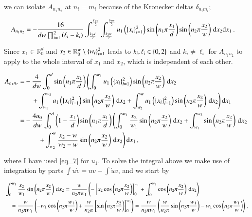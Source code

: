 \documentclass[11pt,english,a4paper]{article}
\begin{document}
\begin{flushleft}
we can isolate $A_{n_1 n_2}$ at $n_i=m_i$ because of the Kronecker deltas $\delta_{n_i m_i}$;

\begin{align*}
A_{n_1 n_2} &=  - \frac{16}{dw\prod_{i=1}^2\left({\ell_i-k_i}\right)}\int_{\frac{k_1 d}{2}}^{\frac{\ell_1 d}{2}}\int_{\frac{k_2 w}{2}}^{\frac{\ell_2 w}{2}} u_1\left({\left\lbrace{x_i}\right\rbrace_{i=1}^2}\right)\sin\left({n_1\pi\frac{x_1}{d}}\right)\sin\left({n_2\pi\frac{x_2}{w}}\right)\,\mathrm{d}x_2\mathrm{d}x_1 \,.
\end{align*}

Since $x_1\in\mathbb{R}_0^d$ and $x_2\in\mathbb{R}_0^w\setminus \left\lbrace{w_i}\right\rbrace_{i=1}^2$ leads to $k_i,\ell_i \in \left\lbrace{0,2}\right\rbrace$ and $k_i\neq \ell_i$ for $A_{n_1 n_2}$ to apply to the whole interval of $x_1$ and $x_2$, which is independent of each other.

\begin{align*}
A_{n_1 n_2} =&  -\frac{4}{dw}\int_{0}^{d}\sin\left({n_1\pi\frac{x_1}{d}}\right)\left(\int_{0}^{w_1} u_1\left({\left\lbrace{x_i}\right\rbrace_{i=1}^2}\right)\sin\left({n_2\pi\frac{x_2}{w}}\right)\,\mathrm{d}x_2 \right.
\\
&\quad \left.+ \int_{w_1}^{w_2} u_1\left({\left\lbrace{x_i}\right\rbrace_{i=1}^2}\right)\sin\left({n_2\pi\frac{x_2}{w}}\right)\,\mathrm{d}x_2
+ \int_{w_2}^{w} u_1\left({\left\lbrace{x_i}\right\rbrace_{i=1}^2}\right)\sin\left({n_2\pi\frac{x_2}{w}}\right)\,\mathrm{d}x_2\right)\mathrm{d}x_1 
\\
=& -\frac{4 u_0}{dw}\int_{0}^{d}\left({1-\frac{x_1}{d}}\right)\sin\left({n_1\pi\frac{x_1}{d}}\right)\left(\int_0^{w_1}\frac{x_2}{w_1} \sin\left({n_2\pi\frac{x_2}{w}}\right)\,\mathrm{d}x_2 + \int_{w_1}^{w_2}\sin\left({n_2\pi\frac{x_2}{w}}\right)\,\mathrm{d}x_2 \right.
\\
&\qquad \left. + \int_{w_2}^{w}\frac{x_2-w}{w_2-w}\sin\left({n_2\pi\frac{x_2}{w}}\right)\,\mathrm{d}x_2 \right)\mathrm{d}x_1 \,,
\end{align*}

where I have used \eqref{eq_7} for $u_1$. To solve the integral above we make use of integration by parts $\int u\dot{v} = uv - \int \dot{u}v$, and we start by

\begin{align*}
&\int_0^{w_1}\frac{x_2}{w_1} \sin\left({n_2\pi\frac{x_2}{w}}\right)\,\mathrm{d}x_2 = \frac{w}{n_2\pi w_1}\left({-\left[{x_2\cos\left({n_2 \pi \frac{x_2}{w}}\right)}\right]_0^{w_1} + \int_0^{w_1}\cos\left({n_2 \pi \frac{x_2}{w}}\right)\,\mathrm{d}x_2}\right)
\\
&\quad= \frac{w}{n_2\pi w_1}\left({-w_1\cos\left({n_2 \pi \frac{w_1}{w}}\right) + \frac{w}{n_2\pi}\left[{\sin\left({n_2 \pi \frac{x_2}{w}}\right)}\right]_0^{w_1}}\right)
= \frac{w}{n_2\pi w_1}\left({\frac{w}{n_2\pi}\sin\left({n_2 \pi \frac{w_1}{w}}\right) - w_1\cos\left({n_2 \pi \frac{w_1}{w}}\right)}\right) \,,
\end{align*}


\end{flushleft}
\end{document}
